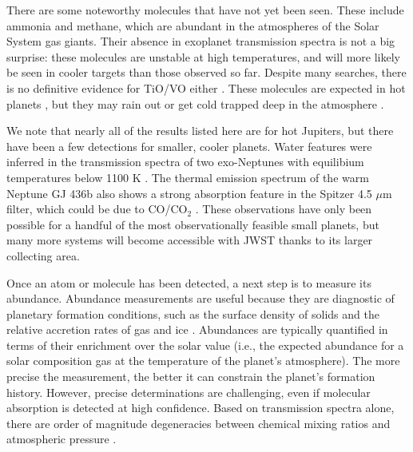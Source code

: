 \documentclass[graybox,natbib,nosecnum]{svmult}
\begin{document}
There are some noteworthy molecules that have not yet been seen. These include ammonia and methane, which are abundant in the atmospheres of the Solar System gas giants. Their absence in exoplanet transmission spectra is not a big surprise: these molecules are unstable at high temperatures, and will more likely be seen in cooler targets than those observed so far.  Despite many searches, there is no definitive evidence for TiO/VO either \citep[e.g.,][]{sing13, evans16}. These molecules are expected in hot planets \citep{fortney08}, but they may rain out or get cold trapped deep in the atmosphere \citep{parmentier13}.

We note that nearly all of the results listed here are for hot Jupiters, but there have been a few detections for smaller, cooler planets. Water features were inferred in the transmission spectra of two exo-Neptunes with equilibium temperatures below 1100 K \citep{fraine14, wakeford17}. The thermal emission spectrum of the warm Neptune GJ 436b also shows a strong absorption feature in the Spitzer 4.5 $\mu$m filter, which could be due to CO/CO$_2$ \citep{morley17}.  These observations have only been possible for a handful of the most observationally feasible small planets, but many more systems will become accessible with JWST thanks to its larger collecting area. 

Once an atom or molecule has been detected, a next step is to measure its abundance. Abundance measurements are useful because they are diagnostic of planetary formation conditions, such as the surface density of solids and the relative accretion rates of gas and ice \citep[e.g.][]{fortney13, mordasini16}. Abundances are typically quantified in terms of their enrichment over the solar value (i.e., the expected abundance for a solar composition gas at the temperature of the planet's atmosphere).  The more precise the measurement, the better it can constrain the planet's formation history. However, precise determinations are challenging, even if molecular absorption is detected at high confidence.  Based on transmission spectra alone, there are order of magnitude degeneracies between chemical mixing ratios and atmospheric pressure \citep{benneke12, griffith13}.  
\end{document}
